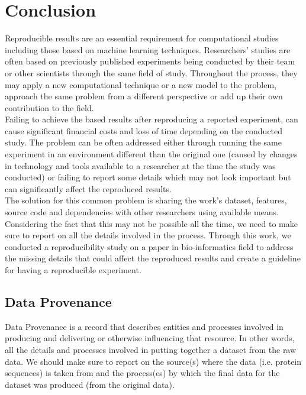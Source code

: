 \section {Conclusion}

Reproducible results are an essential requirement for computational studies including those based on machine learning techniques. 
Researchers' studies are often based on previously published experiments being conducted by their team or other scientists 
through the same field of study. 
Throughout the process, they may apply a new computational technique or a new model to the problem, 
approach the same problem from a different perspective or add up their own contribution to the field. \\

Failing to achieve the based results after reproducing a reported experiment, can cause significant financial costs 
and loss of time depending on the conducted study. The problem can be often addressed either through running the same 
experiment in an environment different than the original one (caused by changes in technology and tools available to a 
researcher at the time the study was conducted) or failing to report some details which may not look important but 
can significantly affect the reproduced results. \\

The solution for this common problem is sharing the work's dataset, features, source code and dependencies with other 
researchers using available means. Considering the fact that this may not be possible all the time, we need to make 
sure to report on all the details involved in the process. Through this work, we conducted a reproducibility study on a paper 
in bio-informatics field to address the missing details that could affect the reproduced results and create a guideline for 
having a reproducible experiment. 


    \subsection{Data Provenance}

    Data Provenance is a record that describes entities and processes involved in producing and delivering or otherwise influencing 
    that resource. \cite{w3c}  In other words, all the details and processes involved in putting together a dataset from the raw data. 
    We should make sure to report on the source(s) where the data (i.e. protein sequences) is taken from and the process(es) 
    by which the final data for the dataset was produced (from the original data). \\
    
